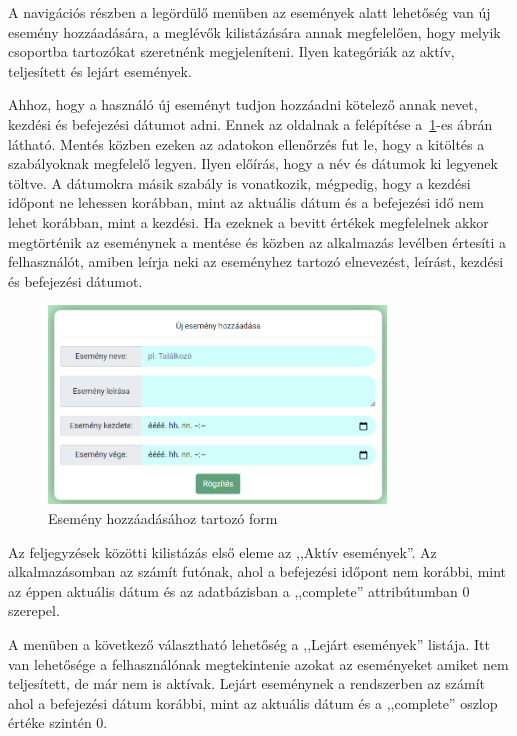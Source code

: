 \documentclass[
]{thesis-ekf}
\theoremstyle{definition}
\theoremstyle{remark}
\begin{document}
	A navigációs részben a legördülő menüben az események alatt lehetőség van új esemény hozzáadására, a meglévők kilistázására annak megfelelően, hogy melyik csoportba tartozókat szeretnénk megjeleníteni. Ilyen kategóriák az aktív, teljesített és lejárt események. 
	
	Ahhoz, hogy a használó új eseményt tudjon hozzáadni kötelező annak nevet, kezdési és befejezési dátumot adni. Ennek az oldalnak a felépítése a~\ref{figure:web_add_event}-es ábrán látható. Mentés közben ezeken az adatokon ellenőrzés fut le, hogy a kitöltés a szabályoknak megfelelő legyen. Ilyen előírás, hogy a név és dátumok ki legyenek töltve. A dátumokra másik szabály is vonatkozik, mégpedig, hogy a kezdési időpont ne lehessen korábban, mint az aktuális dátum és a befejezési idő nem lehet korábban, mint a kezdési. Ha ezeknek a bevitt értékek megfelelnek akkor megtörténik az eseménynek a mentése és közben az alkalmazás levélben értesíti a felhasználót, amiben leírja neki az eseményhez tartozó elnevezést, leírást, kezdési és befejezési dátumot. 
	
	\begin{figure}[ht!]
		\centering
		\includegraphics[width=0.8\textwidth]{web_app/web_add_event}
		\caption{Esemény hozzáadásához tartozó form}
		\label{figure:web_add_event}
	\end{figure}
	
	Az feljegyzések közötti kilistázás első eleme az ,,Aktív események''. Az alkalmazásomban az számít futónak, ahol a befejezési időpont nem korábbi, mint az éppen aktuális dátum és az adatbázisban a ,,complete''  attribútumban 0 szerepel.
	
	A menüben a következő választható lehetőség a ,,Lejárt események'' listája. Itt van lehetősége a felhasználónak megtekintenie azokat az eseményeket amiket nem teljesített, de már nem is aktívak. Lejárt eseménynek a rendszerben az számít ahol a befejezési dátum korábbi, mint az aktuális dátum és a ,,complete'' oszlop értéke szintén 0. 
	
\end{document}
